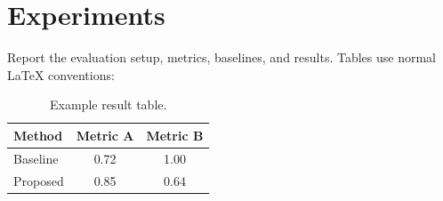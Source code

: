 \section{Experiments}

Report the evaluation setup, metrics, baselines, and results. Tables use normal
LaTeX conventions:

\begin{table}[h]
  \centering
  \caption{Example result table.}
  \label{tab:example}
  \begin{tabular}{lcc}
    \toprule
    Method & Metric A & Metric B \\
    \midrule
    Baseline & 0.72 & 1.00 \\
    Proposed & 0.85 & 0.64 \\
    \bottomrule
  \end{tabular}
\end{table}
